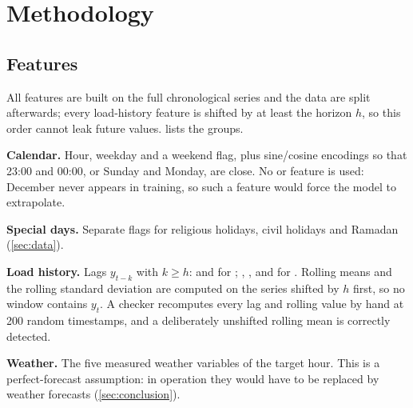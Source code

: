\section{Methodology}\label{sec:method}
\subsection{Features}\label{sec:features}
All features are built on the full chronological series and the data are split afterwards; every load-history feature is shifted by at least the horizon $h$, so this order cannot leak future values.  lists the groups.

\textbf{Calendar.} Hour, weekday and a weekend flag, plus sine/cosine encodings so that 23:00 and 00:00, or Sunday and Monday, are close. No  or  feature is used: December never appears in training, so such a feature would force the model to extrapolate.

\textbf{Special days.} Separate flags for religious holidays, civil holidays and Ramadan (\cref{sec:data}).

\textbf{Load history.} Lags $y_{t-k}$ with $k\ge h$:  and  for \hday; , ,  and  for \hone. Rolling means and the rolling standard deviation are computed on the series shifted by $h$ first, so no window contains $y_t$. A checker recomputes every lag and rolling value by hand at 200 random timestamps, and a deliberately unshifted rolling mean is correctly detected.

\textbf{Weather.} The five measured weather variables of the target hour. This is a perfect-forecast assumption: in operation they would have to be replaced by weather forecasts (\cref{sec:conclusion}).

